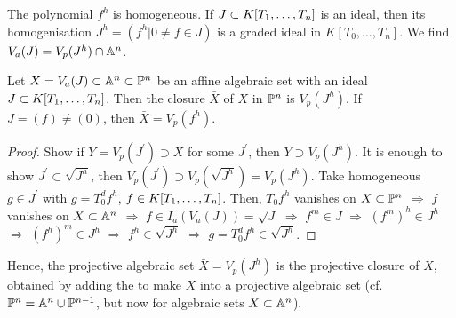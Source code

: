 \documentclass[a4paper,11pt]{article}
\begin{document}
			\noindent The polynomial $f^h$ is homogeneous. If $J\subset\K$ is an ideal, then its homogenisation $J^h=(f^h|0\neq f\in J)$ is a graded ideal in $K[T_0,\dots,T_n]$. We find $V_a(J)=V_p(J^h)\cap\AA^n$.
			
			\begin{prop}
				Let $X=V_a(J)\subset\AA^n\subset\P^n$ be an affine algebraic set with an ideal $J\subset\K$. Then the closure $\bar{X}$ of $X$ in $\P^n$ is $V_p(J^h)$. If $J=(f)\neq(0)$, then $\bar{X}=V_p(f^h)$.
			\end{prop}
			\begin{proof}
				Show if $Y=V_p(J^\prime)\supset X$ for some $J^\prime$, then $Y\supset V_p(J^h)$. It is enough to show $J^\prime\subset\sqrt{J^h}$, then $V_p(J^\prime)\supset V_p(\sqrt{J^h})=V_p(J^h)$. Take homogeneous $g\in J^\prime$ with $g=T_0^d f^h$, $f\in\K$. Then, $T_0f^h$ vanishes on $X\subset\P^n$ $\Longrightarrow$ $f$ vanishes on $X\subset\AA^n$ $\Longrightarrow$ $f\in I_a(V_a(J))=\sqrt{J}$ $\Longrightarrow$ $f^m\in J$ $\Longrightarrow$ $(f^m)^h\in J^h$ $\Longrightarrow$ $(f^h)^m\in J^h$ $\Longrightarrow$ $f^h\in\sqrt{J^h}$ $\Longrightarrow$ $g=T_0^df^h\in\sqrt{J^h}$.
			\end{proof}

			Hence, the projective algebraic set $\bar{X}=V_p(J^h)$ is the projective closure of $X$, obtained by adding the  to make $X$ into a projective algebraic set (cf. $\P^n=\AA^n\cup\P^{n-1}$, but now for algebraic sets $X\subset\AA^n$).
\end{document}
